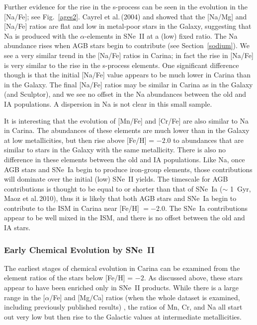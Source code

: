 \documentclass{emulateapj}
\newcommand\kms{km\,s$^{-1}$}
\newcommand\etal{{\rm et al.\,}}
\begin{document}
Further evidence for the rise in the s-process can be seen in
the evolution in the [Na/Fe]; see Fig.~\ref{ages2}.   
Cayrel \etal (2004) and \citep{And07}
showed that the [Na/Mg] and [Na/Fe] ratios are flat and low in metal-poor
stars in the Galaxy, suggesting that Na is produced with the $\alpha$-elements
in SNe~II at a (low) fixed ratio.  The Na abundance rises when AGB stars 
begin to contribute (see Section~\ref{sodium}).   
We see a very similar trend in the [Na/Fe] ratios
in Carina; in fact the rise in [Na/Fe] is very similar to the rise in
the s-process elements.    One significant difference though is that
the initial [Na/Fe] value appears to be much lower in Carina than in 
the Galaxy.    The final [Na/Fe] ratios may be similar in Carina 
as in the Galaxy (and Sculptor), and we see no offset in the Na
abundances between the old and IA populations.    A dispersion in
Na is not clear in this small sample.
 
It is interesting that the evolution of [Mn/Fe] and [Cr/Fe] are also 
similar to Na in Carina.   The abundances of these elements are much 
lower than in the Galaxy at low metallicities, but then rise above 
[Fe/H] = $-2.0$ to abundances that are similar to stars in the Galaxy 
with the same metallicity.  There is also no difference in these 
elements between the old and IA populations.    Like Na, once AGB stars
and SNe~Ia begin to produce iron-group elements, those
contributions will dominate over the initial (low) SNe~II yields. 
%
The timescale for AGB contributions is thought to be equal to or 
shorter than that of SNe~Ia ($\sim$ 1~Gyr, Maoz \etal 2010), thus it is
likely that both AGB stars and SNe~Ia begin to contribute to the ISM in
Carina near [Fe/H] $= -2.0$.   The SNe~Ia contributions appear to
be well mixed in the ISM, and there is no offset between the old
and IA stars.






\subsubsection {Early Chemical Evolution by SNe~II}

The earliest stages of chemical evolution in Carina can be examined
from the element ratios of the stars below [Fe/H] = $-2$.  As discussed above,
these stars appear to have been enriched only in SNe~II products.   While
there is a large range in the [$\alpha$/Fe] and [Mg/Ca] ratios 
 (when the whole dataset is examined, including previously published 
results) , 
the ratios of Mn, Cr, and Na all start out very low but then rise to the 
Galactic values at intermediate metallicities.   
\end{document}
